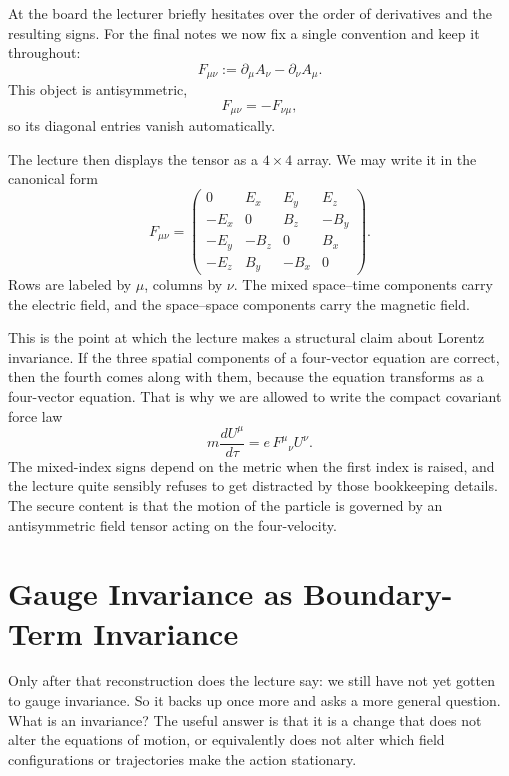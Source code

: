 At the board the lecturer briefly hesitates over the order of derivatives and the resulting signs. For the final notes we now fix a single convention and keep it throughout:
\begin{equation}
F_{\mu\nu}:=\partial_\mu A_\nu-\partial_\nu A_\mu.
\end{equation}
This object is antisymmetric,
\begin{equation}
F_{\mu\nu}=-F_{\nu\mu},
\end{equation}
so its diagonal entries vanish automatically.

The lecture then displays the tensor as a \(4\times 4\) array. We may write it in the canonical form
\begin{equation}
F_{\mu\nu}
=
\begin{pmatrix}
0 & E_x & E_y & E_z \\
-E_x & 0 & B_z & -B_y \\
-E_y & -B_z & 0 & B_x \\
-E_z & B_y & -B_x & 0
\end{pmatrix}.
\end{equation}
Rows are labeled by \(\mu\), columns by \(\nu\). The mixed space--time components carry the electric field, and the space--space components carry the magnetic field.

This is the point at which the lecture makes a structural claim about Lorentz invariance. If the three spatial components of a four-vector equation are correct, then the fourth comes along with them, because the equation transforms as a four-vector equation. That is why we are allowed to write the compact covariant force law
\begin{equation}
m\frac{dU^\mu}{d\tau}=e\,F^\mu{}_{\nu}U^\nu.
\end{equation}
The mixed-index signs depend on the metric when the first index is raised, and the lecture quite sensibly refuses to get distracted by those bookkeeping details. The secure content is that the motion of the particle is governed by an antisymmetric field tensor acting on the four-velocity.

\section{Gauge Invariance as Boundary-Term Invariance}

Only after that reconstruction does the lecture say: we still have not yet gotten to gauge invariance. So it backs up once more and asks a more general question. What is an invariance? The useful answer is that it is a change that does not alter the equations of motion, or equivalently does not alter which field configurations or trajectories make the action stationary.

